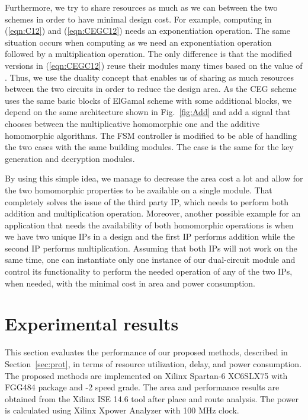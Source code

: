 \documentclass[conference]{IEEEtran}
\begin{document}
Furthermore, we try to share resources as much as we can between the two schemes in order to have minimal design cost. For example, computing  in (\ref{eqn:C12}) and (\ref{eqn:CEGC12}) needs an exponentiation operation. The same situation occurs when computing  as we need an exponentiation operation followed by a multiplication operation. The only difference is that the modified versions in (\ref{eqn:CEGC12}) reuse their modules many times based on the value of . Thus, we use the duality concept that enables us of sharing as much resources between the two circuits in order to reduce the design area. As the CEG scheme uses the same basic blocks of ElGamal scheme with some additional blocks, we depend on the same architecture shown in Fig.~\ref{fig:Add} and add a  signal that chooses between the multiplicative homomorphic one and the additive homomorphic algorithms. The FSM controller is modified to be able of handling the two cases with the same building modules. The case is the same for the key generation and decryption modules. 

By using this simple idea, we manage to decrease the area cost a lot and allow for the two homomorphic properties to be available on a single module. That completely solves the issue of the third party IP, which needs to perform both addition and multiplication operation. Moreover, another possible example for an application that needs the availability of both homomorphic operations is when we have two unique IPs in a design and the first IP performs addition while the second IP performs multiplication. Assuming that both IPs will not work on the same time, one can instantiate only one instance of our dual-circuit module and control its functionality to perform the needed operation of any of the two IPs, when needed, with the minimal cost in area and power consumption.  

\section{Experimental results} \label{sec:expr}

This section evaluates the performance of our proposed methods, described in Section~\ref{sec:prot}, in terms of resource utilization, delay, and power consumption. The proposed methods are implemented on Xilinx Spartan-6 XC6SLX75 with FGG484 package and -2 speed grade. The area and performance results are obtained from the Xilinx ISE 14.6 tool after place and route analysis. The power is calculated using Xilinx Xpower Analyzer with 100 MHz clock.   
\end{document}
